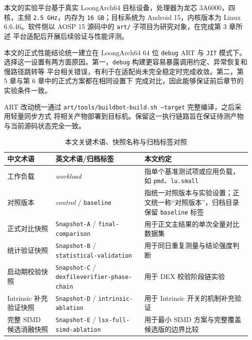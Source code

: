 本文的实验平台基于真实 LoongArch64 目标设备，处理器为龙芯 3A6000，四核，主频
\texttt{2.5\,GHz}，内存为 \texttt{16\,GB}；目标系统为 Android 15，内核版本为
Linux 6.6.46。软件侧以 AOSP 15 源码中的 \texttt{art/} 子项目为研究对象，在完成第 3 章所述
平台适配后开展后续验证与性能评测\citep{Loongson3A6000DataBook2023,AospArtAndroid15R1}。

本文的正式性能结论统一建立在 LoongArch64 64 位 \texttt{debug} ART 与 \texttt{JIT} 模式下。
选择这一设置有两方面原因。第一，\texttt{debug} 构建更容易暴露调用约定、异常恢复和慢路径跳转等
平台相关错误，有利于在适配尚未完全稳定时完成收敛。第二，第 5 章与第 6 章中的正式方案都在相同设置下
完成对比，因此能够保证前后章节的实验条件一致。

ART 改动统一通过 \texttt{art/tools/buildbot-build.sh --target} 完整编译，之后采用轻量同步方式
将相关产物部署到目标机。保留这一执行链路旨在保证待测产物与当前源码状态完全一致。

\begin{table}[htbp]
    \centering
    \small
    \caption{本文关键术语、快照名称与归档标签对照}
    \label{tab:experiment-terms}
    \begin{tabular}{>{\raggedright\arraybackslash}p{2.7cm}>{\raggedright\arraybackslash}p{3.6cm}>{\raggedright\arraybackslash}p{5.0cm}}
        \hline
        \textbf{中文术语} & \textbf{英文术语/归档标签} & \textbf{本文约定} \\
        \hline
        工作负载 & \textit{workload} & 指单个基准测试项或应用负载，如 \texttt{pmd}、\texttt{lu.small} \\
        对照版本 & \textit{control} / \texttt{baseline} & 指统一对照版本与实验设置；正文统一称“对照版本”，归档目录保留 \texttt{baseline} 标签 \\
        正式对比快照 & \texttt{Snapshot-A} / \texttt{final-comparison} & 用于正文主结果的单次全量对比数据集 \\
        统计验证快照 & \texttt{Snapshot-B} / \texttt{statistical-validation} & 用于同日重复测量与结论强度判断 \\
        启动期校验快照 & \texttt{Snapshot-C} / \texttt{dexfileverifier-phase-chain} & 用于 DEX 校验阶段链实验 \\
        Intrinsic 补充验证快照 & \texttt{Snapshot-D} / \texttt{intrinsic-ablation} & 用于 Intrinsic 开关的机制补充验证 \\
        完整 SIMD 候选消融快照 & \texttt{Snapshot-E} / \texttt{lsx-full-simd-ablation} & 用于最小 SIMD 方案与完整覆盖候选版的边界比较 \\
        \hline
    \end{tabular}
\end{table}

